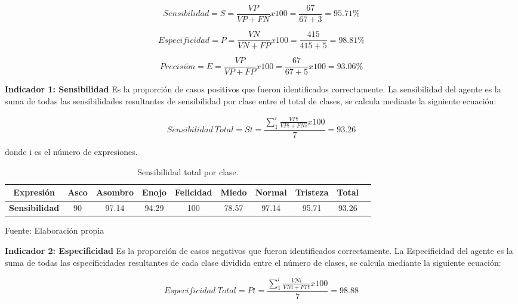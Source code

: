 \begin{equation}
Sensibilidad=S=\frac{VP}{VP+FN}x100=\frac{67}{67+3}=95.71\%
\end{equation}

\begin{equation}
Especificidad=P=\frac{VN}{VN+FP}x100=\frac{415}{415+5}=98.81\%
\end{equation}

\begin{equation}
Precisi\acute{o}n=E=\frac{VP}{VP+FP}x100=\frac{67}{67+5}x100=93.06\%
\end{equation}

\vskip 5cm

{\bf Indicador 1: Sensibilidad} \vskip 0.1cm
Es la proporción de casos positivos que fueron identificados correctamente. La sensibilidad del agente es la suma de todas las sensibilidades resultantes de sensibilidad por clase entre el total de clases, se calcula mediante la siguiente ecuación:

\begin{equation}
Sensibilidad~Total=St=\frac{\sum_{1}^{i}\frac{VPi}{VPi+FNi}x100}{7}=93.26
\end{equation}

donde i es el número de expresiones. 

\begin{table}[ht!]
\centering
\caption{Sensibilidad total por clase.} \vskip 0.1cm
\begin{tabular}{|c|c|c|c|c|c|c|c|c|c|} \hline
\bf Expresión & \bf Asco & \bf Asombro & \bf Enojo & \bf Felicidad & \bf Miedo & \bf Normal & \bf Tristeza & \bf Total \\ \hline
\bf Sensibilidad & 90 & 97.14 & 94.29 & 100 & 78.57 & 97.14 & 95.71 & 93.26 \\ \hline

\end{tabular}
\begin{center}
{\small{Fuente: Elaboración propia}}
\end{center}
\end{table}


\vskip 1cm

{\bf Indicador 2: Especificidad} \vskip 0.1cm
Es la proporción de casos negativos que fueron identificados correctamente. La Especificidad del agente es la suma de todas las especificidades resultantes de cada clase dividida entre el número de clases, se calcula mediante la siguiente ecuación:

\begin{equation}
Especificidad~Total=Pt=\frac{\sum_{1}^{i}\frac{VNi}{VNi+FPi}x100}{7}=98.88
\end{equation}

